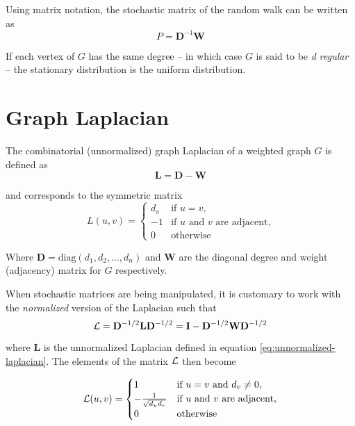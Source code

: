 Using matrix notation, the stochastic matrix of the random walk can be written as
\begin{equation}
P = \mathbf{D}^{-1}\mathbf{W}
\label{eq:random-walk}
\end{equation}

If each vertex of $G$ has the same degree -- in which case $G$ is said to be \textit{d
regular} -- the stationary distribution is the uniform distribution. 


\section{Graph Laplacian}
\label{sec:laplacian}

The combinatorial (unnormalized) graph Laplacian of a weighted graph $G$ is defined
as
\begin{equation}
\mathbf{L} = \mathbf{D} - \mathbf{W}
\label{eq:unnormalized-laplacian}
\end{equation}

and corresponds to the symmetric matrix
\begin{equation}
L(u,v) = 
\begin{cases}
d_v & \mbox{if $u = v$,} \\
-1 & \text{if $u$ and $v$ are adjacent,} \\
0 & \text{otherwise}
\end{cases}
\end{equation}

Where $\mathbf{D} = \text{diag}(d_1, d_2, \dots, d_n)$ and $\mathbf{W}$ are the
diagonal degree and weight (adjacency) matrix for $G$ respectively.

When stochastic matrices are being manipulated, it is customary to work with the
\textit{normalized}
version of the Laplacian such that
\begin{equation}
\mathbf{\mathcal{L}} = \mathbf{D}^{-1/2} \mathbf{L} \mathbf{D}^{-1/2} = \mathbf{I} -
\mathbf{D}^{-1/2} \mathbf{W} \mathbf{D}^{-1/2}
\label{eq:normalized-laplacian}
\end{equation}	

where $\mathbf{L}$ is the unnormalized Laplacian defined in equation
\ref{eq:unnormalized-laplacian}.  The elements of the matrix $\mathbf{\mathcal{L}}$ then become

\begin{align}
\mathbf{\mathcal{L}}(u,v) = 
\begin{cases}
1 & \text{if $u = v$ and $d_v \neq 0$,} \\
-\frac{1}{\sqrt{d_u d_v}} & \text{if $u$ and $v$ are adjacent,}\\
0 & \text{otherwise}
\end{cases}
\end{align}

